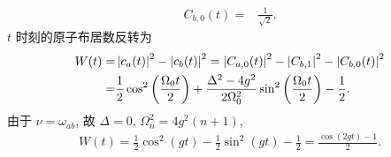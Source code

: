 \documentclass{assignment}
\begin{document}
\begin{sol}
\begin{itemize}
\begin{align}
            C_{b,0}(t)=&\frac{1}{\sqrt{2}}.
        \end{align}
        $t$ 时刻的原子布居数反转为
        \begin{align}
            \notag W(t)=&\left\lvert c_a(t)\right\rvert^2-\left\lvert c_b(t)\right\rvert^2=\left\lvert C_{a,0}(t)\right\rvert^2-\left\lvert C_{b,1}\right\rvert^2-\left\lvert C_{b,0}(t)\right\rvert^2\\
            =&\frac{1}{2}\cos^2\left(\frac{\Omega_0t}{2}\right)+\frac{\Delta^2-4g^2}{2\Omega_0^2}\sin^2\left(\frac{\Omega_0t}{2}\right)-\frac{1}{2}.
        \end{align}
        由于 $\nu=\omega_{ab}$, 故 $\Delta=0$, $\Omega_n^2=4g^2(n+1)$,
        \begin{align}
            W(t)=\frac{1}{2}\cos^2(gt)-\frac{1}{2}\sin^2(gt)-\frac{1}{2}=\frac{\cos(2gt)-1}{2}.
        \end{align}
    \end{itemize}
\end{sol}
\end{document}
